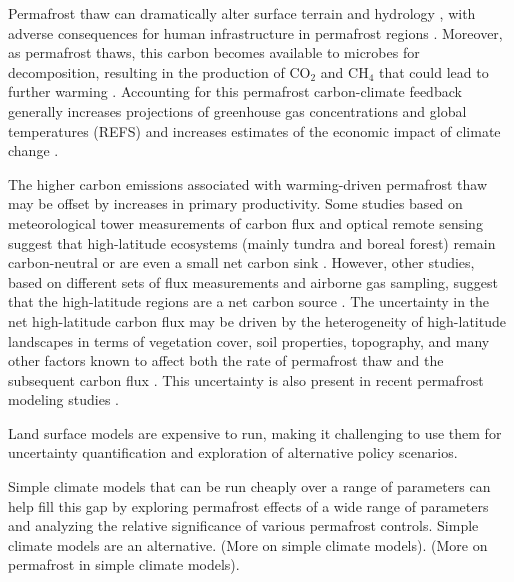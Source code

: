 \documentclass[essd, manuscript]{copernicus}
\begin{document}
Permafrost thaw can dramatically alter surface terrain and hydrology \citep{jones_2013_quantifying, godin_2014_effects, necsoiu_2013_multi-temporal}, with adverse consequences for human infrastructure in permafrost regions \citep{anisimov_1997_permafrost, nelson_2002_climate, larsen_2008_estimating}.
Moreover, as permafrost thaws, this carbon becomes available to microbes for decomposition, resulting in the production of CO$_2$ and CH$_4$ \citep{brown_2008_report, romanovsky_2010_thermal, bond-lamberty_2016_temperature} that could lead to further warming \citep{koven_2011_permafrost, schuur_2015_climate}. Accounting for this permafrost carbon-climate feedback generally increases projections of greenhouse gas concentrations and global temperatures (REFS) and increases estimates of the economic impact of climate change \citep{hope_2015_economic, yumashev_2019_climate, chen_2019_economic}.

The higher carbon emissions associated with warming-driven permafrost thaw may be offset by increases in primary productivity.
Some studies based on meteorological tower measurements of carbon flux and optical remote sensing suggest that high-latitude ecosystems (mainly tundra and boreal forest) remain carbon-neutral or are even a small net carbon sink \citep{mcguire_2012_assessment, welp_2016_increasing}.
However, other studies, based on different sets of flux measurements and airborne gas sampling, suggest that the high-latitude regions are a net carbon source \citep{belshe_2013_tundra, commane_2017_carbon, natali_2019_large}.
The uncertainty in the net high-latitude carbon flux may be driven by the heterogeneity of high-latitude landscapes in terms of vegetation cover, soil properties, topography, and many other factors known to affect both the rate of permafrost thaw and the subsequent carbon flux \citep{turetsky_2002_boreal, wickland_2006_effects, lund_2010_variability, james_2013_multi-decadal, johnson_2013_permafrost, grant_2019_modeling1, grant_2019_modeling2}.
This uncertainty is also present in recent permafrost modeling studies \citep{burke_2017_quantifying, qian_2010_enhanced, ito_2016_impacts, harp_2016_effect}.

Land surface models are expensive to run, making it challenging to use them for uncertainty quantification and exploration of alternative policy scenarios.

Simple climate models that can be run cheaply over a range of parameters can help fill this gap by exploring permafrost effects of a wide range of parameters and analyzing the relative significance of various permafrost controls.
Simple climate models are an alternative.
(More on simple climate models).
(More on permafrost in simple climate models).
\end{document}
